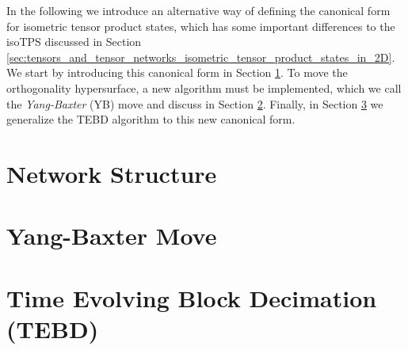In the following we introduce an alternative way of defining the canonical form for isometric tensor product states, which has some important differences to the isoTPS discussed in Section \ref{sec:tensors_and_tensor_networks_isometric_tensor_product_states_in_2D}. We start by introducing this canonical form in Section \ref{sec:YB_isoTPS_network_structure}. To move the orthogonality hypersurface, a new algorithm must be implemented, which we call the \textit{Yang-Baxter} (YB) move and discuss in Section \ref{sec:YB_isoTPS_yang_baxter_move}. Finally, in Section \ref{sec:YB_isoTPS_TEBD} we generalize the TEBD algorithm to this new canonical form.

\section{Network Structure}
\label{sec:YB_isoTPS_network_structure}


\section{Yang-Baxter Move}
\label{sec:YB_isoTPS_yang_baxter_move}


\section{Time Evolving Block Decimation (TEBD)}
\label{sec:YB_isoTPS_TEBD}
